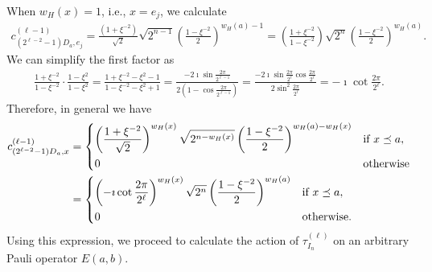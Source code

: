 \documentclass[twoside,romanappendices]{IEEEtran}
\begin{document}
When $w_H(x) = 1$, i.e., $x = e_j$, we calculate 
\begin{align}
c_{(2^{\ell-2} - 1) D_a, e_j}^{(\ell-1)} = \frac{(1 + \xi^{-2})}{\sqrt{2}} \sqrt{2^{n-1}} \left( \frac{1 - \xi^{-2}}{2} \right)^{w_H(a) - 1} = \left( \frac{1 + \xi^{-2}}{1 - \xi^{-2}} \right) \sqrt{2^n} \left( \frac{1 - \xi^{-2}}{2} \right)^{w_H(a)}.
\end{align}
We can simplify the first factor as
\begin{align}
\frac{1 + \xi^{-2}}{1 - \xi^{-2}} \cdot \frac{1 - \xi^2}{1 - \xi^2} = \frac{1 + \xi^{-2} - \xi^2 - 1}{1 - \xi^{-2} - \xi^2 + 1} = \frac{-2\imath \sin\frac{2\pi}{2^{\ell-1}}}{2 \left( 1 - \cos\frac{2\pi}{2^{\ell-1}} \right)} = \frac{-2\imath \sin\frac{2\pi}{2^\ell} \cos\frac{2\pi}{2^\ell}}{2 \sin^2\frac{2\pi}{2^\ell}} = -\imath \cot\frac{2\pi}{2^\ell}.
\end{align}
Therefore, in general we have
\begin{align}
c_{(2^{\ell-2} - 1) D_a, x}^{(\ell-1)} & = 
\begin{dcases}
\left( \frac{1 + \xi^{-2}}{\sqrt{2}} \right)^{w_H(x)} \sqrt{2^{n-w_H(x)}} \left( \frac{1 - \xi^{-2}}{2} \right)^{w_H(a) - w_H(x)} & \text{if}\ x \preceq a, \\
0 & \text{otherwise}
\end{dcases} \\
%
\label{eq:D_ak_coeff_value}
  & = 
\begin{dcases}
\left( -\imath \cot\frac{2\pi}{2^\ell} \right)^{w_H(x)} \sqrt{2^n} \left( \frac{1 - \xi^{-2}}{2} \right)^{w_H(a)} & \text{if}\ x \preceq a, \\
0 & \text{otherwise}.
\end{dcases}
\end{align}
Using this expression, we proceed to calculate the action of $\tau_{I_n}^{(\ell)}$ on an arbitrary Pauli operator $E(a,b)$. 
\end{document}
